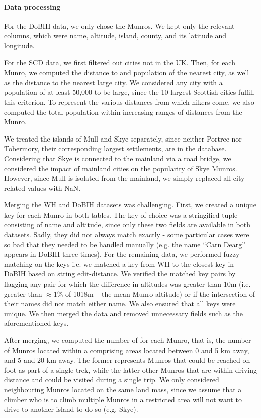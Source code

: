 \documentclass[11pt,a4paper]{article}
\begin{document}
\paragraph{Data processing}
For the DoBIH data, we only chose the Munros. We kept only the relevant columns, which were name, altitude, island, county, and its latitude and longitude.

For the SCD data, we first filtered out cities not in the UK. Then, for each Munro, we computed the distance to and population of the nearest city, as well as the distance to the nearest large city. We considered any city with a population of at least 50,000 to be large, since the 10 largest Scottish cities fulfill this criterion. To represent the various distances from which hikers come, we also computed the total population within increasing ranges of distances from the Munro.

We treated the islands of Mull and Skye separately, since neither Portree nor Tobermory, their corresponding largest settlements, are in the database. Considering that Skye is connected to the mainland via a road bridge, we considered the impact of mainland cities on the popularity of Skye Munros. However, since Mull is isolated from the mainland, we simply replaced all city-related values with NaN.

Merging the WH and DoBIH datasets was challenging. First, we created a unique key for each Munro in both tables. The key of choice was a stringified tuple consisting of name and altitude, since only these two fields are available in both datasets. Sadly, they did not always match exactly - some particular cases were so bad that they needed to be handled manually (e.g. the name “Carn Dearg” appears in DoBIH three times). For the remaining data, we performed fuzzy matching on the keys i.e. we matched a key from WH to the closest key in DoBIH based on string edit-distance. We verified the matched key pairs by flagging any pair for which the difference in altitudes was greater than 10m (i.e. greater than $\approx1\%$ of 1018m – the mean Munro altitude) or if the intersection of their names did not match either name. We also ensured that all keys were unique. We then merged the data and removed unnecessary fields such as the aforementioned keys.

After merging, we computed the number of  for each Munro, that is, the number of Munros located within a  comprising areas located between 0 and 5 km away, and 5 and 20 km away. The former represents Munros that could be reached on foot as part of a single trek, while the latter other Munros that are within driving distance and could be visited during a single trip. We only considered neighbouring Munros located on the same land mass, since we assume that a climber who is to climb multiple Munros in a restricted area will not want to drive to another island to do so (e.g. Skye).
\end{document}
